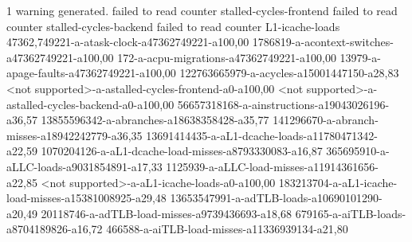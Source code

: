 1 warning generated. failed to read counter stalled-cycles-frontend failed to read counter stalled-cycles-backend failed to read counter L1-icache-loads 47362,749221-a-atask-clock-a47362749221-a100,00 1786819-a-acontext-switches-a47362749221-a100,00 172-a-acpu-migrations-a47362749221-a100,00 13979-a-apage-faults-a47362749221-a100,00 122763665979-a-acycles-a15001447150-a28,83 <not supported>-a-astalled-cycles-frontend-a0-a100,00 <not supported>-a-astalled-cycles-backend-a0-a100,00 56657318168-a-ainstructions-a19043026196-a36,57 13855596342-a-abranches-a18638358428-a35,77 141296670-a-abranch-misses-a18942242779-a36,35 13691414435-a-aL1-dcache-loads-a11780471342-a22,59 1070204126-a-aL1-dcache-load-misses-a8793330083-a16,87 365695910-a-aLLC-loads-a9031854891-a17,33 1125939-a-aLLC-load-misses-a11914361656-a22,85 <not supported>-a-aL1-icache-loads-a0-a100,00 183213704-a-aL1-icache-load-misses-a15381008925-a29,48 13653547991-a-adTLB-loads-a10690101290-a20,49 20118746-a-adTLB-load-misses-a9739436693-a18,68 679165-a-aiTLB-loads-a8704189826-a16,72 466588-a-aiTLB-load-misses-a11336939134-a21,80
